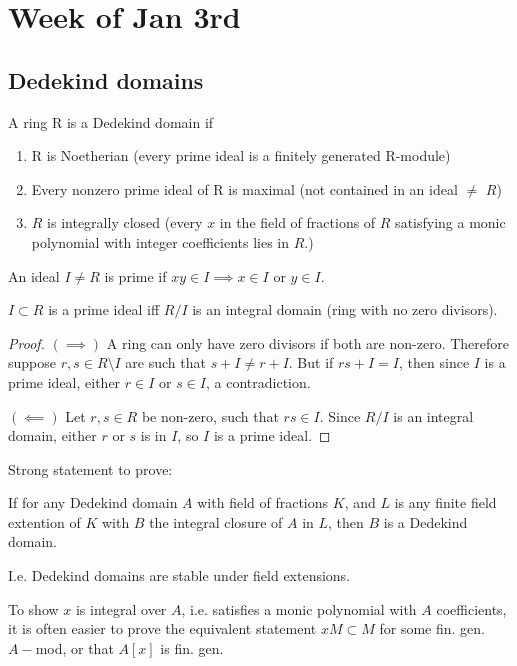 \section{Week of Jan 3rd}
\subsection{Dedekind domains}
\begin{definition}
A ring R is a Dedekind domain if
\begin{enumerate}
    \item R is Noetherian (every prime ideal is a finitely generated R-module)
    \item Every nonzero prime ideal of R is maximal (not contained in an ideal $\neq$ $R$)
    \item $R$ is integrally closed (every $x$ in the field of fractions of $R$ satisfying a monic polynomial with integer coefficients lies in $R$.)
\end{enumerate}
\end{definition}
\begin{definition}
An ideal $I\neq R$ is prime if $xy\in I\implies x\in I$ or $y\in I$.
\end{definition}

\begin{prop}
$I\subset R$ is a prime ideal iff $R/I$ is an integral domain (ring with no zero divisors).
\end{prop}
\begin{proof}
$(\implies)$ A ring can only have zero divisors if both are non-zero. Therefore suppose $r,s\in R\setminus{I}$ are such that $s+I\neq r+I$. But if $rs+I=I$, then since $I$ is a prime ideal, either $r\in I$ or $s\in I$, a contradiction.

$(\impliedby)$ Let $r,s\in R$ be non-zero, such that $rs\in I$. Since $R/I$ is an integral domain, either $r$ or $s$ is in $I$, so $I$ is a prime ideal.
\end{proof}

Strong statement to prove: 
\begin{theorem}
If for any Dedekind domain $A$ with field of fractions $K$, and $L$ is any finite field extention of $K$ with $B$ the integral closure of $A$ in $L$, then $B$ is a Dedekind domain.
\end{theorem}

I.e. Dedekind domains are stable under field extensions.

To show $x$ is integral over $A$, i.e. satisfies a monic polynomial with $A$ coefficients, it is often easier to prove the equivalent statement $xM\subset M$ for some fin. gen. $A-$mod, or that $A[x]$ is fin. gen.


